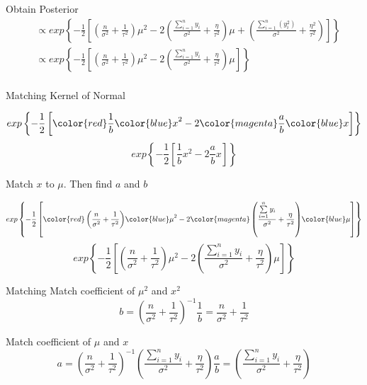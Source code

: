 \documentclass[10pt]{beamer}
\begin{document}
\begin{frame}{Obtain Posterior}
  \begin{align*}
    &\propto exp\left\{-\frac{1}{2}\left[\left(\frac{n}{\sigma^2}+\frac{1}{\tau^2}\right)\mu^2-2\left(\frac{\sum\limits_{i=1}^{n} y_i}{\sigma^2}+\frac{\eta}{\tau^2}\right)\mu
      +\left(\frac{\sum\limits_{i=1}^{n} (y^2_i)}{\sigma^2}+\frac{\eta^2}{\tau^2}\right)\right]\right\}\\
    &\propto exp\left\{-\frac{1}{2}\left[\left(\frac{n}{\sigma^2}+\frac{1}{\tau^2}\right)\mu^2-2\left(\frac{\sum\limits_{i=1}^{n} y_i}{\sigma^2}+\frac{\eta}{\tau^2}\right)\mu
      \right]\right\}\\
  \end{align*}
\end{frame}
\begin{frame}{Matching}
  Kernel of Normal


  {
    \begin{equation*}
      exp\left\{-\frac{1}{2}\left[{\color{red} \frac{1}{b}}{\color{blue} x}^2-2{\color{magenta} \frac{a}{b}}{\color{blue} x}\right]\right\}
    \end{equation*}
  }
  {
    \begin{equation*}
      exp\left\{-\frac{1}{2}\left[\frac{1}{b}x^2-2\frac{a}{b}x\right]\right\}
    \end{equation*}
  }

  Match $x$ to $\mu$.  Then find $a$ and $b$


  {
    \begin{equation*}
      exp \left\{-\frac{1}{2}\left[{\color{red} \left(\frac{n}{\sigma^2}+\frac{1}{\tau^2}\right)}{\color{blue} \mu}^2-2{\color{magenta} \left(\frac{\sum\limits_{i=1}^{n} y_i}{\sigma^2}+\frac{\eta}{\tau^2}\right)}{\color{blue} \mu}\right]\right\}
    \end{equation*}
  }
  {
    \begin{equation*}
      exp\left\{-\frac{1}{2}\left[\left(\frac{n}{\sigma^2}+\frac{1}{\tau^2}\right)\mu^2-2\left(\frac{\sum\limits_{i=1}^{n} y_i}{\sigma^2}+\frac{\eta}{\tau^2}\right)\mu
        \right]\right\}
    \end{equation*}
  }

\end{frame}
\begin{frame}{Matching}
  Match coefficient of $\mu^2$ and $x^2$
  \begin{equation}
    {b=\left(\frac{n}{\sigma^2}+\frac{1}{\tau^2}\right)^{-1}}{\frac{1}{b}=\frac{n}{\sigma^2}+\frac{1}{\tau^2}}
  \end{equation}


  Match coefficient of $\mu$ and $x$
  \begin{equation}
    {a=\left(\frac{n}{\sigma^2}+\frac{1}{\tau^2}\right)^{-1}\left(\frac{\sum\limits_{i=1}^{n} y_i}{\sigma^2}+\frac{\eta}{\tau^2}\right)}{\frac{a}{b}=\left(\frac{\sum\limits_{i=1}^{n} y_i}{\sigma^2}+\frac{\eta}{\tau^2}\right)}
  \end{equation}

\end{frame}
\end{document}
